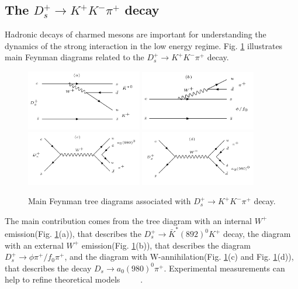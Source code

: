 {}

\subsection{The $D_{s}^{+} \rightarrow K^{+}K^{-}\pi^{+}$ decay}
\par{
    Hadronic decays of charmed mesons are important for understanding the dynamics of the strong interaction in the low energy regime.
    Fig. \ref{Feynman-dia} illustrates main Feynman diagrams related to the $D_{s}^{+} \rightarrow K^{+}K^{-}\pi^{+}$ decay.
    \begin{figure}[htbp]
        \centering
        \includegraphics[width=0.45\textwidth]{plot/Fa.PNG}
        \includegraphics[width=0.45\textwidth]{plot/Fb.PNG}
        \includegraphics[width=0.45\textwidth]{plot/Fc.PNG}
        \includegraphics[width=0.45\textwidth]{plot/Fd.PNG}
        \caption{Main Feynman tree diagrams associated with $D_{s}^{+} \rightarrow K^{+}K^{-}\pi^{+}$ decay.}
        \label{Feynman-dia}
    \end{figure}
    The main contribution comes from the tree diagram with an internal $W^{+}$ emission(Fig. \ref{Feynman-dia}(a)), that describes the $D_{s}^{+} \rightarrow \bar{K}^{*}(892)^{0}K^{+}$ decay, 
    the diagram with an external $W^{+}$ emission(Fig. \ref{Feynman-dia}(b)), that describes the diagram $D_{s}^{+} \rightarrow \phi\pi^{+}/ f_{0}\pi^{+}$, 
    and the diagram with W-annihilation(Fig. \ref{Feynman-dia}(c) and Fig. \ref{Feynman-dia}(d)), that describes the decay $D_{s} \rightarrow a_{0}(980)^{0}\pi^{+}$.
    Experimental measurements can help to refine theoretical models ~\cite{PRD67-094007} ~\cite{PRD81-074031} ~\cite{PLB707-116}.
}
    
